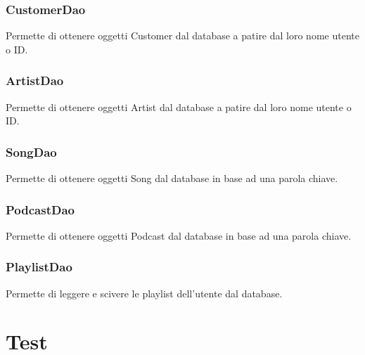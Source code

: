 \documentclass{article}
\begin{document}
  \subsubsection{CustomerDao}
  Permette di ottenere oggetti Customer dal database a patire dal loro nome utente o ID.

  \subsubsection{ArtistDao}
  Permette di ottenere oggetti Artist dal database a patire dal loro nome utente o ID.

  \subsubsection{SongDao}
  Permette di ottenere oggetti Song dal database in base ad una parola chiave.

  \subsubsection{PodcastDao}
  Permette di ottenere oggetti Podcast dal database in base ad una parola chiave.

  \subsubsection{PlaylistDao}
  Permette di leggere e scivere le playlist dell'utente dal database.


  \section{Test}

  \begin{figure}[H]
    
  \end{figure}
\end{document}
